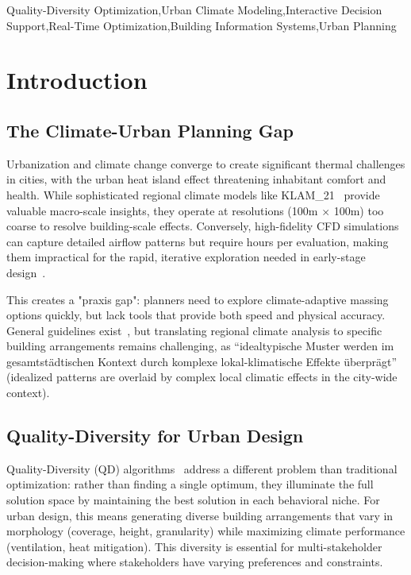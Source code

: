 \documentclass[times,final]{elsarticle}
\begin{document}
\begin{frontmatter}
\begin{keyword}
Quality-Diversity Optimization\sep Urban Climate Modeling\sep Interactive Decision Support\sep Real-Time Optimization\sep Building Information Systems\sep Urban Planning
\end{keyword}

\end{frontmatter}

\section{Introduction}

\subsection{The Climate-Urban Planning Gap}

Urbanization and climate change converge to create significant thermal challenges in cities, with the urban heat island effect threatening inhabitant comfort and health. While sophisticated regional climate models like KLAM\_21~\cite{Kruse2018lanuv} provide valuable macro-scale insights, they operate at resolutions (100m $\times$ 100m) too coarse to resolve building-scale effects. Conversely, high-fidelity CFD simulations can capture detailed airflow patterns but require hours per evaluation, making them impractical for the rapid, iterative exploration needed in early-stage design~\cite{allegrini2015coupled}.

This creates a "praxis gap": planners need to explore climate-adaptive massing options quickly, but lack tools that provide both speed and physical accuracy. General guidelines exist~\cite{alcoforado2009application}, but translating regional climate analysis to specific building arrangements remains challenging, as ``idealtypische Muster werden im gesamtstädtischen Kontext durch komplexe lokal-klimatische Effekte überprägt''~\cite{berchtold2023MUTABOR} (idealized patterns are overlaid by complex local climatic effects in the city-wide context).

\subsection{Quality-Diversity for Urban Design}

Quality-Diversity (QD) algorithms~\cite{mouret2015illuminating} address a different problem than traditional optimization: rather than finding a single optimum, they illuminate the full solution space by maintaining the best solution in each behavioral niche. For urban design, this means generating diverse building arrangements that vary in morphology (coverage, height, granularity) while maximizing climate performance (ventilation, heat mitigation). This diversity is essential for multi-stakeholder decision-making where stakeholders have varying preferences and constraints.
\end{document}
